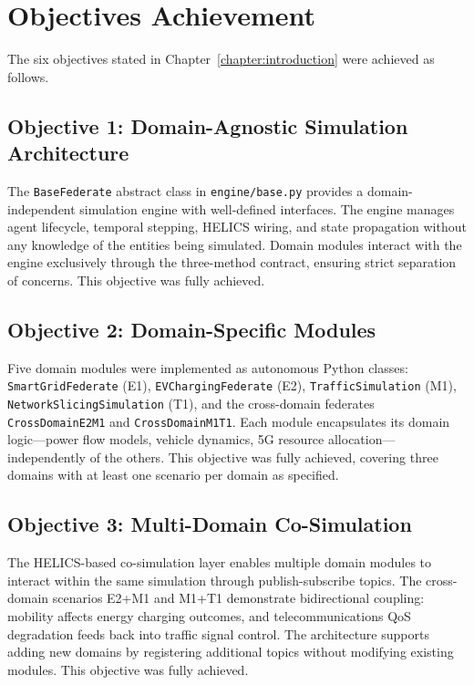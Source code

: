 \section{Objectives Achievement}

The six objectives stated in Chapter~\ref{chapter:introduction} were achieved as follows.

\subsection{Objective 1: Domain-Agnostic Simulation Architecture}

The \texttt{BaseFederate} abstract class in \texttt{engine/base.py} provides a domain-independent simulation engine with well-defined interfaces. The engine manages agent lifecycle, temporal stepping, HELICS wiring, and state propagation without any knowledge of the entities being simulated. Domain modules interact with the engine exclusively through the three-method contract, ensuring strict separation of concerns. This objective was fully achieved.

\subsection{Objective 2: Domain-Specific Modules}

Five domain modules were implemented as autonomous Python classes: \texttt{SmartGridFederate} (E1), \texttt{EVChargingFederate} (E2), \texttt{TrafficSimulation} (M1), \texttt{NetworkSlicingSimulation} (T1), and the cross-domain federates \texttt{CrossDomainE2M1} and \texttt{CrossDomainM1T1}. Each module encapsulates its domain logic---power flow models, vehicle dynamics, 5G resource allocation---independently of the others. This objective was fully achieved, covering three domains with at least one scenario per domain as specified.

\subsection{Objective 3: Multi-Domain Co-Simulation}

The HELICS-based co-simulation layer enables multiple domain modules to interact within the same simulation through publish-subscribe topics. The cross-domain scenarios E2+M1 and M1+T1 demonstrate bidirectional coupling: mobility affects energy charging outcomes, and telecommunications QoS degradation feeds back into traffic signal control. The architecture supports adding new domains by registering additional topics without modifying existing modules. This objective was fully achieved.


